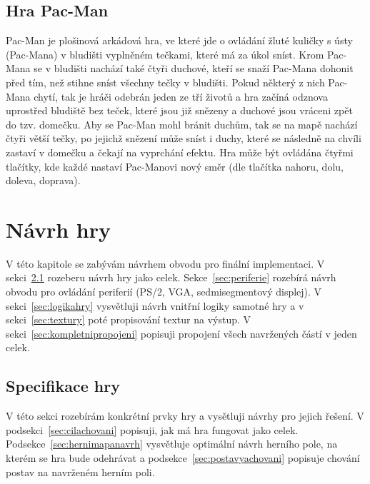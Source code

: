 \documentclass{report}
\begin{document}
\section{Hra Pac-Man}\label{sec:hrapacman}
Pac-Man je plošinová arkádová hra, ve které jde o ovládání žluté kuličky s ústy (Pac-Mana) v bludišti vyplněném tečkami, které má za úkol sníst. Krom Pac-Mana se v bludišti nachází také čtyři duchové, kteří se snaží Pac-Mana dohonit před tím, než stihne sníst všechny tečky v bludišti. Pokud některý z nich Pac-Mana chytí, tak je hráči odebrán jeden ze tří životů a hra začíná odznova uprostřed bludiště bez teček, které jsou již snězeny a duchové jsou vráceni zpět do tzv. domečku. Aby se Pac-Man mohl bránit duchům, tak se na mapě nachází čtyři větší tečky, po jejichž snězení může sníst i duchy, které se následně na chvíli zastaví v domečku a čekají na vyprchání efektu. Hra může být ovládána čtyřmi tlačítky, kde každé nastaví Pac-Manovi nový směr (dle tlačítka nahoru, dolu, doleva, doprava).  

\chapter{Návrh hry}
V této kapitole se zabývám návrhem obvodu pro finální implementaci. V sekci~\ref{sec:specifikacehry} rozeberu návrh hry jako celek. Sekce~\ref{sec:periferie} rozebírá návrh obvodu pro ovládání periferií (PS/2, VGA, sedmisegmentový displej). V sekci~\ref{sec:logikahry} vysvětluji návrh vnitřní logiky samotné hry a v sekci~\ref{sec:textury} poté propisování textur na výstup. V sekci~\ref{sec:kompletnipropojeni} popisuji propojení všech navržených částí v jeden celek.

\section{Specifikace hry}\label{sec:specifikacehry}
V této sekci rozebírám konkrétní prvky hry a vysětluji návrhy pro jejich řešení. V podsekci~\ref{sec:cilachovani} popisuji, jak má hra fungovat jako celek. Podsekce~\ref{sec:hernimapanavrh} vysvětluje optimální návrh herního pole, na kterém se hra bude odehrávat a podsekce~\ref{sec:postavyachovani} popisuje chování postav na navrženém herním poli.
\end{document}
